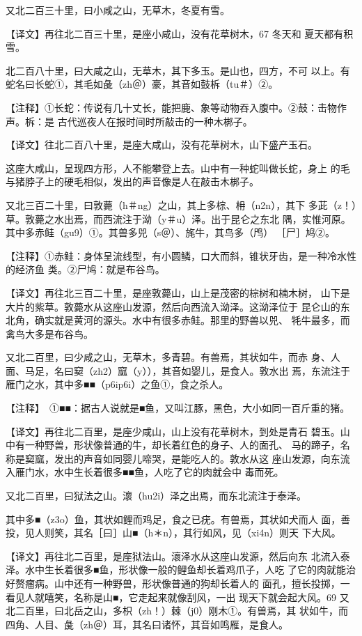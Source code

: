 \documentclass[a4paper,12pt,UTF8,twoside]{ctexbook}
\begin{document}
又北二百三十里，曰小咸之山，无草木，冬夏有雪。

【译文】再往北二百三十里，是座小咸山，没有花草树木，67 冬天和 夏天都有积雪。

北二百八十里，曰大咸之山，无草木，其下多玉。是山也，四方，不可 以上。有蛇名曰长蛇①，其毛如彘（zh＠）豪，其音如鼓柝（tu＃）②。

【注释】①长蛇：传说有几十丈长，能把鹿、象等动物吞入腹中。②鼓：击物作声。柝：是 古代巡夜人在报时间时所敲击的一种木梆子。

【译文】往北二百八十里，是座大咸山，没有花草树木，山下盛产玉石。

这座大咸山，呈现四方形，人不能攀登上去。山中有一种蛇叫做长蛇，身上 的毛与猪脖子上的硬毛相似，发出的声音像是人在敲击木梆子。

又北三百二十里，曰敦薨（h＃ng）之山，其上多棕、枏（n2n），其下 多茈（z！）草。敦薨之水出焉，而西流注于泑（y＃u）泽。出于昆仑之东北 隅，实惟河原。其中多赤鲑（gu9）①。其兽多兕（s＠）、旄牛，其鸟多（鸤） ［尸］鸠②。

【注释】①赤鲑：身体呈流线型，有小圆鳞，口大而斜，锥状牙齿，是一种冷水性的经济鱼 类。②尸鸠：就是布谷鸟。

【译文】再往北三百二十里，是座敦薨山，山上是茂密的棕树和楠木树， 山下是大片的紫草。敦薨水从这座山发源，然后向西流入泑泽。这泑泽位于 昆仑山的东北角，确实就是黄河的源头。水中有很多赤鲑。那里的野兽以兕、 牦牛最多，而禽鸟大多是布谷鸟。

又北二百里，曰少咸之山，无草木，多青碧。有兽焉，其状如牛，而赤 身、人面、马足，名曰窫（zh2）窳（y）），其音如婴儿，是食人。敦水出 焉，东流注于雁门之水，其中多■■（p6ip6i）之鱼①，食之杀人。

【注释】　①■■：据古人说就是■鱼，又叫江豚，黑色，大小如同一百斤重的猪。

【译文】再往北二百里，是座少咸山，山上没有花草树木，到处是青石 碧玉。山中有一种野兽，形状像普通的牛，却长着红色的身子、人的面孔、 马的蹄子，名称是窫窳，发出的声音如同婴儿啼哭，是能吃人的。敦水从这 座山发源，向东流入雁门水，水中生长着很多■■鱼，人吃了它的肉就会中 毒而死。

又北二百里，曰狱法之山。瀤（hu2i）泽之出焉，而东北流注于泰泽。

其中多■（z3o）鱼，其状如鲤而鸡足，食之已疣。有兽焉，其状如犬而人 面，善投，见人则笑，其名［曰］山■（h＊n），其行如风，见（xi4n）则天 下大风。

【译文】再往北二百里，是座狱法山。瀤泽水从这座山发源，然后向东 北流入泰泽。水中生长着很多■鱼，形状像一般的鲤鱼却长着鸡爪子，人吃 了它的肉就能治好赘瘤病。山中还有一种野兽，形状像普通的狗却长着人的 面孔，擅长投掷，一看见人就嘻笑，名称是山■，它走起来就像刮风，一出 现天下就会起大风。69 又北二百里，曰北岳之山，多枳（zh！）棘（j0）刚木①。有兽焉，其 状如牛，而四角、人目、彘（zh＠）耳，其名曰诸怀，其音如鸣雁，是食人。
\end{document}
